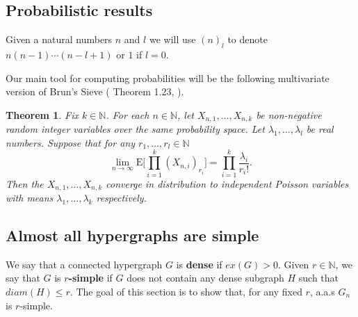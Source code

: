 \documentclass[12pt,notitlepage,a4paper]{article}
\newtheorem{theorem}{Theorem}[section]
\theoremstyle{definition}
\newcommand{\N}{\mathbb{N}}
\newcommand{\Ln}{\lim\limits_{n\to \infty}}
\begin{document}
\subsection{Probabilistic results}

Given a natural numbers $n$ and $l$ we will use 
$(n)_l$ to denote 
$n(n-1)\cdots (n-l+1)$ or $1$ if $l=0$. 

Our main tool for computing probabilities will be
the following multivariate version of Brun's Sieve (
Theorem 1.23, \cite{bollobas2001random}).


\begin{theorem}
	Fix $k\in \N$. For each 
	$n\in \N$, let $X_{n,1},\dots, X_{n,k}$ be non-negative
	random integer variables over the same
	probability space. Let $\lambda_1,\dots,\lambda_l$ 
	be real numbers. Suppose that for any $r_1,\dots,r_l \in \N$
	\[ 
	\Ln \mathrm{E}\big[
	\prod_{i=1}^{k} (X_{n,i})_{r_i} \big]
	= \prod_{i=1}^{k} \frac{\lambda_i}{r_i !}.	
	\]
	Then the $X_{n,1},\dots,X_{n,k}$ converge in distribution to
	independent Poisson variables with means $\lambda_1,\dots,\lambda_k$ 
	respectively. 
\end{theorem}


\subsection{Almost all hypergraphs are simple}


We say that a connected hypergraph $G$ is \textbf{dense} if
$ex(G)>0$. Given $r\in \N$, we say that $G$ is \textbf{$r$-simple}
if $G$ does not contain any dense subgraph $H$ such that 
$diam(H)\leq r$. The goal of this section is to show that, for any
fixed $r$, a.a.s $G_n$ is $r$-simple.\par
\end{document}
